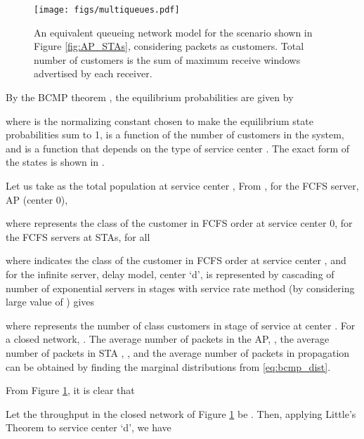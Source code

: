 \documentclass[conference]{IEEEtran}
\begin{document}
\begin{figure}
\centering
\texttt{[image: figs/multiqueues.pdf]} 
\caption{An equivalent queueing network model for the scenario shown in 
Figure \ref{fig:AP_STAs}, considering packets as customers. Total number
 of customers is the sum of maximum receive windows advertised by each receiver.}
\label{fig:threeQs}
\end{figure}


By the BCMP theorem \cite{astn_model:bcmp}, the equilibrium probabilities
are given by 

where  is the normalizing constant chosen to make the equilibrium state probabilities sum to 1,  is a function of the number of customers in the system, and  is a function that depends on the type of service center . The exact form of the states  is shown in \cite{astn_model:bcmp}.

 Let us take  as  the total population at service center ,
From \cite{astn_model:bcmp}, for the FCFS server, AP (center 0),

where  represents the class of the  customer in FCFS order at service center 0,
for the FCFS servers at STAs, for all 

where  indicates the class of the  customer in FCFS order at service center ,
and for the infinite server, delay model, center `d', is represented by
cascading of  number of exponential servers in  stages with service rate
  method (by considering large value of ) gives 

where  represents the number of class  customers in stage 
of service at center . 
For a closed network, .
 The average number of  packets in the AP,  , the average number of
packets in STA ,  , and the average number of packets in 
propagation  can be obtained by finding the marginal distributions from \eqref{eq:bcmp_dist}. 
 
From Figure \ref{fig:threeQs}, it is clear that  

Let the throughput in the closed network of Figure \ref{fig:threeQs} be .
Then, applying Little's Theorem to service center `d', we have
\end{document}
